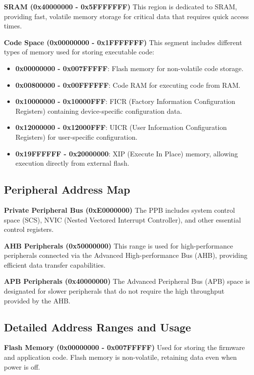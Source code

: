 \documentclass{Configuration_Files/PoliMi3i_thesis}
\begin{document}
\textbf{SRAM (0x40000000 - 0x5FFFFFFF)}
This region is dedicated to SRAM, providing fast, volatile memory storage for critical data that requires quick access times.

\textbf{Code Space (0x00000000 - 0x1FFFFFFF)}
This segment includes different types of memory used for storing executable code:
\begin{itemize}
    \item \textbf{0x00000000 - 0x007FFFFF}: Flash memory for non-volatile code storage.
    \item \textbf{0x00800000 - 0x00FFFFFF}: Code RAM for executing code from RAM.
    \item \textbf{0x10000000 - 0x10000FFF}: FICR (Factory Information Configuration Registers) containing device-specific configuration data.
    \item \textbf{0x12000000 - 0x12000FFF}: UICR (User Information Configuration Registers) for user-specific configuration.
    \item \textbf{0x19FFFFFF - 0x20000000}: XIP (Execute In Place) memory, allowing execution directly from external flash.
\end{itemize}

\subsection{Peripheral Address Map}

\textbf{Private Peripheral Bus (0xE0000000)}
The PPB includes system control space (SCS), NVIC (Nested Vectored Interrupt Controller), and other essential control registers.

\textbf{AHB Peripherals (0x50000000)}
This range is used for high-performance peripherals connected via the Advanced High-performance Bus (AHB), providing efficient data transfer capabilities.

\textbf{APB Peripherals (0x40000000)}
The Advanced Peripheral Bus (APB) space is designated for slower peripherals that do not require the high throughput provided by the AHB.

\subsection{Detailed Address Ranges and Usage}

\textbf{Flash Memory (0x00000000 - 0x007FFFFF)}
Used for storing the firmware and application code. Flash memory is non-volatile, retaining data even when power is off.
\end{document}
